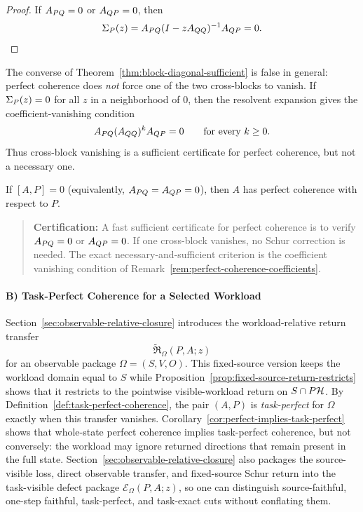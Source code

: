 \begin{proof}
If $A_{PQ} = 0$ or $A_{QP} = 0$, then
\[
\Sigma_{P}(z)
=
A_{PQ} (I - zA_{QQ})^{-1} A_{QP}
=
0.
\]
\end{proof}

\begin{remark}
\label{rem:perfect-coherence-coefficients}
The converse of Theorem~\ref{thm:block-diagonal-sufficient} is false in general:
perfect coherence does \emph{not} force one of the two cross-blocks to vanish.
If \(\Sigma_{P}(z)=0\) for all \(z\) in a neighborhood of \(0\), then the
resolvent expansion gives the coefficient-vanishing condition
\[
A_{PQ} (A_{QQ})^k A_{QP}=0
\qquad\text{for every }k\ge 0.
\]
Thus cross-block vanishing is a sufficient certificate for perfect coherence,
but not a necessary one.
\end{remark}

\begin{corollary}
\label{cor:commutant-perfect}
If $[A, P] = 0$ (equivalently, $A_{PQ} = A_{QP} = 0$), then $A$ has perfect coherence with respect to $P$.
\end{corollary}

\begin{quote}\small
\textbf{Certification:} A fast sufficient certificate for perfect coherence is
to verify $A_{PQ} = 0$ or $A_{QP} = 0$.
If one cross-block vanishes, no Schur correction is needed.
The exact necessary-and-sufficient criterion is the coefficient vanishing
condition of Remark~\ref{rem:perfect-coherence-coefficients}.
\end{quote}

\paragraph{B) Task-Perfect Coherence for a Selected Workload}

Section~\ref{sec:observable-relative-closure} introduces the workload-relative
return transfer
\[
\widetilde{\mathfrak R}_{\Omega}(P,A;z)
\]
for an observable package \(\Omega=(S,V,O)\). This fixed-source version keeps
the workload domain equal to \(S\) while
Proposition~\ref{prop:fixed-source-return-restricts} shows that it restricts
to the pointwise visible-workload return on \(S\cap P\mathcal{H}\). By
Definition~\ref{def:task-perfect-coherence}, the pair \((A,P)\) is
\emph{task-perfect} for \(\Omega\) exactly when this transfer vanishes.
Corollary~\ref{cor:perfect-implies-task-perfect} shows that whole-state perfect
coherence implies task-perfect coherence, but not conversely: the workload may
ignore returned directions that remain present in the full state.
Section~\ref{sec:observable-relative-closure} also packages the source-visible
loss, direct observable transfer, and fixed-source Schur return into the
task-visible defect package \(\mathcal E_{\Omega}(P,A;z)\), so one can
distinguish source-faithful, one-step faithful, task-perfect, and task-exact
cuts without conflating them.

